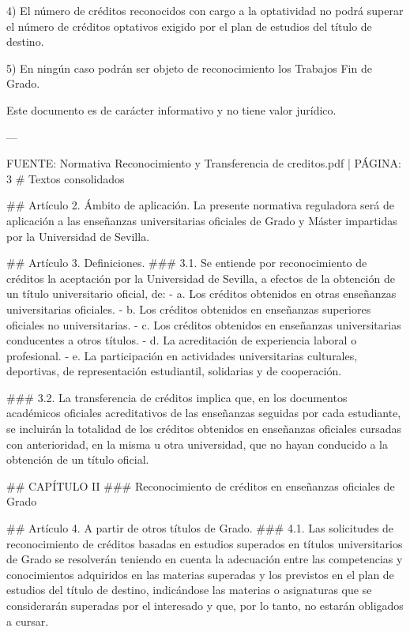 \documentclass{article}
\begin{document}
\begin{itemize}
\begin{itemize}
\begin{scriptsize}
                  4) El número de créditos reconocidos con cargo a la optatividad no podrá superar el número de créditos optativos exigido por el plan de estudios del título de destino.

                  5) En ningún caso podrán ser objeto de reconocimiento los Trabajos Fin de Grado.

                  Este documento es de carácter informativo y no tiene valor jurídico.

                  ---

                  FUENTE: Normativa Reconocimiento y Transferencia de creditos.pdf | PÁGINA: 3
                  \# Textos consolidados

                  \#\# Artículo 2. Ámbito de aplicación.
                  La presente normativa reguladora será de aplicación a las enseñanzas universitarias oficiales de Grado y Máster impartidas por la Universidad de Sevilla.

                  \#\# Artículo 3. Definiciones.
                  \#\#\# 3.1.
                  Se entiende por reconocimiento de créditos la aceptación por la Universidad de Sevilla, a efectos de la obtención de un título universitario oficial, de:
                  - a. Los créditos obtenidos en otras enseñanzas universitarias oficiales.
                  - b. Los créditos obtenidos en enseñanzas superiores oficiales no universitarias.
                  - c. Los créditos obtenidos en enseñanzas universitarias conducentes a otros títulos.
                  - d. La acreditación de experiencia laboral o profesional.
                  - e. La participación en actividades universitarias culturales, deportivas, de representación estudiantil, solidarias y de cooperación.

                  \#\#\# 3.2.
                  La transferencia de créditos implica que, en los documentos académicos oficiales acreditativos de las enseñanzas seguidas por cada estudiante, se incluirán la totalidad de los créditos obtenidos en enseñanzas oficiales cursadas con anterioridad, en la misma u otra universidad, que no hayan conducido a la obtención de un título oficial.

                  \#\# CAPÍTULO II
                  \#\#\# Reconocimiento de créditos en enseñanzas oficiales de Grado

                  \#\# Artículo 4. A partir de otros títulos de Grado.
                  \#\#\# 4.1.
                  Las solicitudes de reconocimiento de créditos basadas en estudios superados en títulos universitarios de Grado se resolverán teniendo en cuenta la adecuación entre las competencias y conocimientos adquiridos en las materias superadas y los previstos en el plan de estudios del título de destino, indicándose las materias o asignaturas que se considerarán superadas por el interesado y que, por lo tanto, no estarán obligados a cursar.


\end{scriptsize}
\end{itemize}
\end{itemize}
\end{document}

